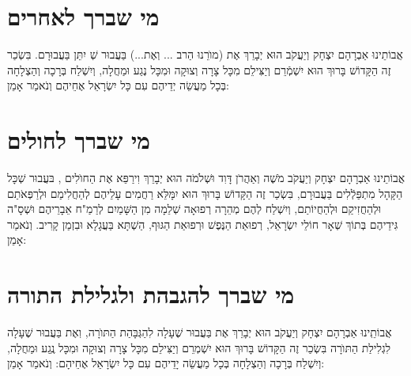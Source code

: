 \documentclass[a4paper, twoside, openany, parskip=half, 11pt]{article}
\begin{document}
\section*{מי שברך לאחרים}
 אֲבוֹתֵינוּ אַבְרָהָם יִצְחָק וְיַעֲקֹב הוּא יְבָרֵךְ אֶת (מוׂרֵנוּ הַרב ... וְאֶת...) בַּעֲבוּר  שְׁ
  יִתֵּן 
   בַּעֲבוּרָם. בִּשְׂכַר זֶה הַקָּדוֹשׁ בָּרוּךְ הוּא יִשְׁמְֿרֵם וְיַצִּילֵם מִכָּל צָרָה וְצוּקָה וּמִכָּל נֶגַע וּמַחֲלָה,
  וְיִשְׁלַח בְּרָכָה וְהַצְלָחָה בְּכָל מַעֲשֵׂה יְדֵיהֶם עִם כָּל יִשְׂרָאֵל אֶחֵיהֶם וְנֹאמַר אָמֵן:

\section*{מי שברך לחולים}
 אֲבוֹתֵינוּ אַבְרָהָם יִצְחָק וְיַעֲקֹב מֹשֶׁה וְאַהֲרֹן דָּוִד וּשְׁלֹמֹה הוּא יְבָרֵךְ וִירַפֵּא אֶת הַחוׂלִים 
,
בּעֲבוּר שְׁכָּל הַקָּהָל מִתְפַּלְֿלִים בַּעֲבוּרָם,  בִּשְׂכַר זֶה
 הַקָּדוֹשׁ בָּרוּךְ הוּא יִמָּלֵּא רַחֲמִים עָלֵיהֶם לְהַחֲלִימַם וּלְרַפְּאֹתַם וּלְהַחֲזִיקַם וּלְהַחֲיוֹתַם, וְיִשְׁלַח לְהֶם מְהֵרָה רְפוּאָה שְׁלֵמָה מִן הַשָּׁמַיִם לְרַמַ"ח אֵבָרֵיהֶם וּשְׁסָ"ה גִּידֵיהֶם בְּתוֹךְ שְׁאָר חוֹלֵי יִשְׂרָאֵל, רְפוּאַת הַנֶּפֶשׁ וּרְפוּאַת הַגּוּף,
 \fcolorbox{sometimes}{sometimes}{שַׁבָּת}
  הַשְׁתָּא בַּעֲגָלָא וּבִזְמַן קָרִיב. וְנֹאמַר אָמֵן:

\section*{מי שברך להגבהת ולגלילת התורה}
 אֲבוֹתֵֽינוּ אַבְרָהָם יִצְחָק וְיַעֲקֹב הוּא יְבָרֵךְ אֶת 
  בַּעֲבוּר שֶׁעָלָה לִהַגְּבָּהַת הַתּוׂרָה, וֽאֶת 
  \instruction{(פלוני בן פלוני)}
   בַּעֲבוּר שֶׁעָלָה לִגְלִילַת הַתּוׂרָה
 בִּשְׂכַר זֶה הַקָּדוֹשׁ בָּרוּךְ הוּא יִשְׁמְרֵם וְיַצִּילֵם מִכָּל צָרָה וְצוּקָה וּמִכָּל נֶֽגַע וּמַחֲלָה,
וְיִשְׁלַח בְּרָכָה וְהַצְלָחָה בְּכָל מַעֲשֵׂה יָדֵיהֶם
  עִם כָּל יִשְׂרָאֵל אֶחֵיהָם: וְנֹאמַר אָמֵן:
\end{document}
